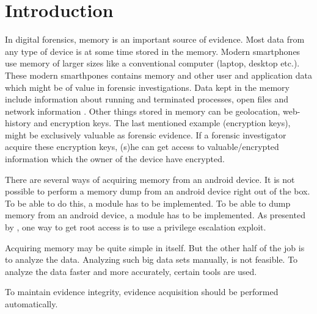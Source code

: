\section{Introduction}


In digital forensics, memory is an important source of evidence. Most data from any type of device
is at some time stored in the memory.
Modern smartphones use memory of larger sizes like a conventional computer (laptop, desktop etc.).
These modern smarthpones contains memory and other user and application data which
might be of value in forensic investigations.
Data kept in the memory include information about running and terminated processes, open files and network
information \cite{acq_vol_android_mem}. Other things stored in memory can be geolocation, web-history and
encryption keys. The last mentioned example (encryption keys), might be exclusively valuable as forensic evidence.
If a forensic investigator acquire these encryption keys, (s)he can get access to valuable/encrypted
information which the owner of the device have encrypted.

There are several ways of acquiring memory from an android device.
It is not possible to perform a memory dump from an android device right out of the box. To be able to do this,
a module has to be implemented. 
To be able to dump memory from an android device, a module has to be implemented.
As presented by \cite{acq_vol_android_mem}, one way to get root access is to use a
privilege escalation exploit. %

Acquiring memory may be quite simple in itself. But the other half of the job is to analyze the data.
Analyzing such big data sets manually, is not feasible. To analyze the data faster and more accurately, certain tools
are used.

To maintain evidence integrity, evidence acquisition should be performed automatically.

